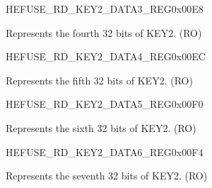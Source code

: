 \begin{register}{H}{EFUSE\_RD\_KEY2\_DATA3\_REG}{0x{}00E8}\label{regdesc:EFUSERDKEY2DATA3REG}
%
\regnewline%
\begin{regdesc}\begin{reglist}
\label{fielddesc:EFUSEKEY2DATA3}\item [EFUSE\_KEY2\_DATA3] Represents the fourth 32 bits of KEY2. (RO)
\end{reglist}\end{regdesc}
\end{register}


\begin{register}{H}{EFUSE\_RD\_KEY2\_DATA4\_REG}{0x{}00EC}\label{regdesc:EFUSERDKEY2DATA4REG}
%
\regnewline%
\begin{regdesc}\begin{reglist}
\label{fielddesc:EFUSEKEY2DATA4}\item [EFUSE\_KEY2\_DATA4] Represents the fifth 32 bits of KEY2. (RO)
\end{reglist}\end{regdesc}
\end{register}


\begin{register}{H}{EFUSE\_RD\_KEY2\_DATA5\_REG}{0x{}00F0}\label{regdesc:EFUSERDKEY2DATA5REG}
%
\regnewline%
\begin{regdesc}\begin{reglist}
\label{fielddesc:EFUSEKEY2DATA5}\item [EFUSE\_KEY2\_DATA5] Represents the sixth 32 bits of KEY2. (RO)
\end{reglist}\end{regdesc}
\end{register}


\begin{register}{H}{EFUSE\_RD\_KEY2\_DATA6\_REG}{0x{}00F4}\label{regdesc:EFUSERDKEY2DATA6REG}
%
\regnewline%
\begin{regdesc}\begin{reglist}
\label{fielddesc:EFUSEKEY2DATA6}\item [EFUSE\_KEY2\_DATA6] Represents the seventh 32 bits of KEY2. (RO)
\end{reglist}\end{regdesc}
\end{register}


